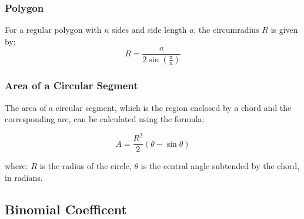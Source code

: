 \subsubsection{Polygon}
For a regular polygon with \( n \) sides and side length \( a \), the circumradius \( R \) is given by:
\[
R = \frac{a}{2 \sin\left(\frac{\pi}{n}\right)}
\]

\subsubsection{Area of a Circular Segment}
The area of a circular segment, which is the region enclosed by a chord and the corresponding arc, can be calculated using the formula:

\[
A = \frac{R^2}{2} \left(\theta - \sin\theta\right)
\]

where:
\( R \) is the radius of the circle,
\( \theta \) is the central angle subtended by the chord, in radians.



\subsection{Binomial Coefficent}

